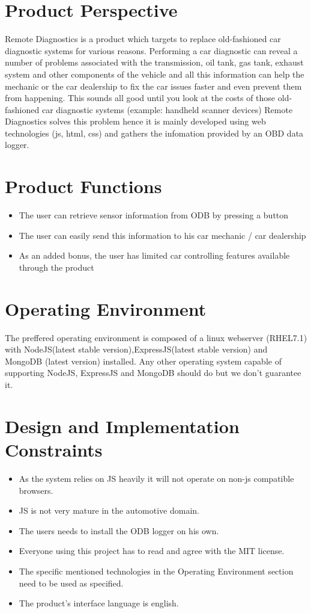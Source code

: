 \documentclass{scrreprt}
\begin{document}
\section{Product Perspective}
Remote Diagnostics is a product which targets to replace old-fashioned car diagnostic systems
for various reasons.
Performing a car diagnostic can reveal a number of problems associated with the transmission,
oil tank, gas tank, exhaust system and other components of the vehicle and all this information
can help the mechanic or the car dealership to fix the car issues faster and even prevent them from
happening.
This sounds all good until you look at the costs of those old-fashioned car diagnostic systems (example: handheld scanner devices)
Remote Diagnostics solves this problem hence it is mainly developed using web technologies (js, html, css) and gathers the infomation
provided by an OBD data logger.



\section{Product Functions}
\begin{itemize}
\item The user can retrieve sensor information from ODB by pressing a button
\item The user can easily send this information to his car mechanic / car dealership
\item As an added bonus, the user has limited car controlling features available through the product
\end{itemize}

\section{Operating Environment}
The preffered operating environment is composed of a linux webserver (RHEL7.1)
with NodeJS(latest stable version),ExpressJS(latest stable version) and MongoDB (latest version) installed.
Any other operating system capable of supporting NodeJS, ExpressJS and MongoDB should do but we don't guarantee it.


\section{Design and Implementation Constraints}
\begin{itemize}
\item As the system relies on JS heavily it will not operate on non-js compatible browsers.
\item JS is not very mature in the automotive domain.
\item The users needs to install the ODB logger on his own.
\item Everyone using this project has to read and agree with the MIT license.
\item The specific mentioned technologies in the Operating Environment section need to be used as specified.
\item The product's interface language is english.
\end{itemize}
\end{document}
